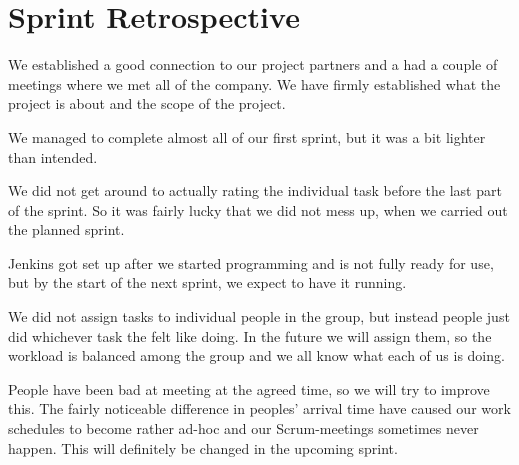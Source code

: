 \section{Sprint Retrospective}

We established a good connection to our project partners and a had a
couple of meetings where we met all of the company. We have firmly
established what the project is about and the scope of the project.

We managed to complete almost all of our first sprint, but it was a bit
lighter than intended.

We did not get around to actually rating the individual task before the
last part of the sprint. So it was fairly lucky that we did not mess up,
when we carried out the planned sprint. 

Jenkins got set up after we started programming and is not fully ready
for use, but by the start of the next sprint, we expect to have it
running.

We did not assign tasks to individual people in the group, but instead
people just did whichever task the felt like doing. In the future we will
assign them, so the workload is balanced among the group and we all know
what each of us is doing.

People have been bad at meeting at the agreed time, so we will try to
improve this. The fairly noticeable difference in peoples' arrival
time have caused our work schedules to become rather ad-hoc and our
Scrum-meetings sometimes never happen. This will definitely be changed in
the upcoming sprint.
